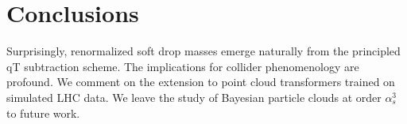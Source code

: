 \section{Conclusions}\label{sec:conclusions}

Surprisingly, renormalized soft drop masses emerge naturally from the
principled qT subtraction scheme. The implications for collider
phenomenology are profound. We comment on the extension to point cloud
transformers trained on simulated LHC data. We leave the study of
Bayesian particle clouds at order $\alpha_s^3$ to future work.

